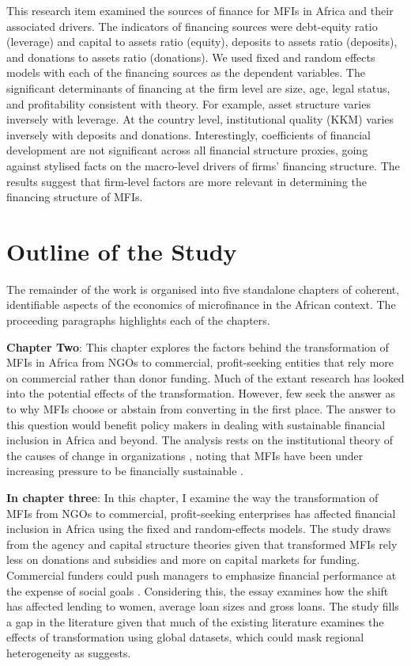 \documentclass[a4paper, nobind]{templates/ociamthesis}
\begin{document}
This research item examined the sources of finance for MFIs in Africa and their associated drivers. The indicators of financing sources were debt-equity ratio (leverage) and capital to assets ratio (equity), deposits to assets ratio (deposits), and donations to assets ratio (donations). We used fixed and random effects models with each of the financing sources as the dependent variables. The significant determinants of financing at the firm level are size, age, legal status, and profitability consistent with theory. For example, asset structure varies inversely with leverage. At the country level, institutional quality (KKM) varies inversely with deposits and donations. Interestingly, coefficients of financial development are not significant across all financial structure proxies, going against stylised facts on the macro-level drivers of firms' financing structure. The results suggest that firm-level factors are more relevant in determining the financing structure of MFIs.

\hypertarget{outline-of-the-study}{%
\section{Outline of the Study}\label{outline-of-the-study}}

\noindent The remainder of the work is organised into five standalone chapters of coherent, identifiable aspects of the economics of microfinance in the African context. The proceeding paragraphs highlights each of the chapters.

\textbf{Chapter Two}: This chapter explores the factors behind the transformation of MFIs in Africa from NGOs to commercial, profit-seeking entities that rely more on commercial rather than donor funding. Much of the extant research has looked into the potential effects of the transformation. However, few seek the answer as to why MFIs choose or abstain from converting in the first place. The answer to this question would benefit policy makers in dealing with sustainable financial inclusion in Africa and beyond. The analysis rests on the institutional theory of the causes of change in organizations \autocite{scott2005institutional,powell2012new}, noting that MFIs have been under increasing pressure to be financially sustainable \autocite{d2013unsubsidized}.

\textbf{In chapter three}: In this chapter, I examine the way the transformation of MFIs from NGOs to commercial, profit-seeking enterprises has affected financial inclusion in Africa using the fixed and random-effects models. The study draws from the agency and capital structure theories given that transformed MFIs rely less on donations and subsidies and more on capital markets for funding. Commercial funders could push managers to emphasize financial performance at the expense of social goals \autocite{sarma2011ngo}. Considering this, the essay examines how the shift has affected lending to women, average loan sizes and gross loans. The study fills a gap in the literature given that much of the existing literature examines the effects of transformation using global datasets, which could mask regional heterogeneity as \textcite{d2017ngos} suggests.
\end{document}
